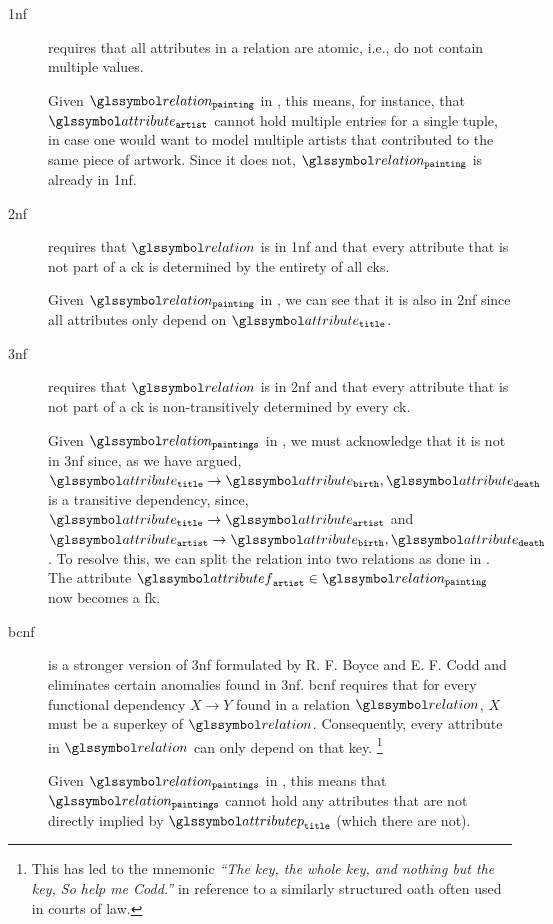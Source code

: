 \begin{description}
    \item[\acrfull{1nf}] \cite{Codd:1970Relational} requires that all attributes in a relation are atomic, i.e., do not contain multiple values.
    
    Given $\relation_{\mathtt{painting}}$ in , this means, for instance, that $\attribute_{\mathtt{artist}}$ cannot hold multiple entries for a single tuple, in case one would want to model multiple artists that contributed to the same piece of artwork. Since it does not, $\relation_{\mathtt{painting}}$ is already in \acrshort{1nf}.
   
    \item[\acrfull{2nf}] \cite{Codd:1972Further} requires that $\relation$ is in \acrshort{1nf} and that every attribute that is not part of a \acrshort{ck} is determined by the entirety of all \acrshort{ck}s.
    
    Given $\relation_{\mathtt{painting}}$ in , we can see that it is also in \acrshort{2nf} since all attributes only depend on $\attribute_\mathtt{title}$.
     
    \item[\acrfull{3nf}] \cite{Codd:1972Further} requires that $\relation$ is in \acrshort{2nf} and that every attribute that is not part of a \acrshort{ck} is non-transitively determined by every \acrshort{ck}. 
    
    Given $\relation_{\mathtt{paintings}}$ in , we must acknowledge that it is not in \acrshort{3nf} since, as we have argued, $\attribute_\mathtt{title} \rightarrow \attribute_{\mathtt{birth}},\attribute_{\mathtt{death}}$ is a transitive dependency, since, $\attribute_\mathtt{title} \rightarrow \attribute_{\mathtt{artist}}$ and $\attribute_{\mathtt{artist}} \rightarrow \attribute_{\mathtt{birth}},\attribute_{\mathtt{death}}$. To resolve this, we can split the relation into two relations as done in . The attribute $\attributef_{\mathtt{artist}} \in \relation_{\mathtt{painting}}$ now becomes a \acrshort{fk}.
    
    \item[\acrfull{bcnf}] \cite{Codd:1974Recent} is a stronger version of \acrshort{3nf} formulated by R. F. Boyce and E. F. Codd and eliminates certain anomalies found in \acrshort{3nf}. \acrshort{bcnf} requires that for every functional dependency $X \rightarrow Y$ found in a relation $\relation$, $X$ must be a superkey of $\relation$. Consequently, every attribute in $\relation$ can only depend on that key. \footnote{This has led to the mnemonic \emph{``The key, the whole key, and nothing but the key, So help me Codd.''} in reference to a similarly structured oath often used in courts of law.}
    
     Given $\relation_{\mathtt{paintings}}$ in , this means that $\relation_{\mathtt{paintings}}$ cannot hold any attributes that are not directly implied by $\attributep_{\mathtt{title}}$ (which there are not).
\end{description}


